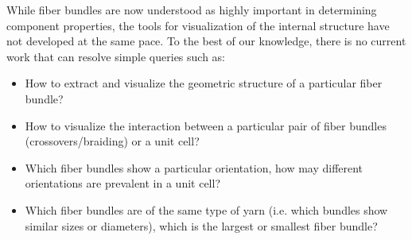 


While fiber bundles are now understood as highly important in determining component properties, the tools for visualization of the internal structure have not developed at the same pace.
To the best of our knowledge, there is no current work that can resolve simple queries such as:
\begin{itemize}
\item{ How to extract and visualize the geometric structure of a particular fiber bundle?}
\item{ How to visualize the interaction between a particular pair of fiber bundles (crossovers/braiding) or a unit cell?}
\item{ Which fiber bundles show a particular orientation, how may different orientations are prevalent in a unit cell? }
\item{ Which fiber bundles are of the same type of yarn (i.e. which bundles show similar sizes or diameters), which is the largest or smallest fiber bundle?}
\end{itemize}

